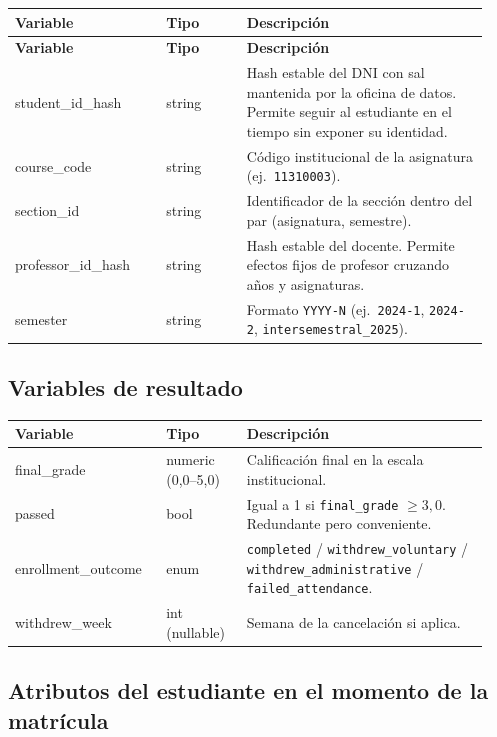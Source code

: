 \documentclass[11pt,a4paper]{article}
\begin{document}
\begin{longtable}{@{}>{\ttfamily}p{0.30\linewidth}p{0.16\linewidth}p{0.48\linewidth}@{}}
\toprule
\rmfamily\textbf{Variable} & \textbf{Tipo} & \textbf{Descripción} \\
\midrule
\endfirsthead
\toprule
\rmfamily\textbf{Variable} & \textbf{Tipo} & \textbf{Descripción} \\
\midrule
\endhead
student\_id\_hash & string & Hash estable del DNI con sal mantenida por la oficina de datos. Permite seguir al estudiante en el tiempo sin exponer su identidad. \\
course\_code     & string & Código institucional de la asignatura (ej.\ \texttt{11310003}). \\
section\_id      & string & Identificador de la sección dentro del par (asignatura, semestre). \\
professor\_id\_hash & string & Hash estable del docente. Permite efectos fijos de profesor cruzando años y asignaturas. \\
semester         & string & Formato \texttt{YYYY-N} (ej.\ \texttt{2024-1}, \texttt{2024-2}, \texttt{intersemestral\_2025}). \\
\bottomrule
\end{longtable}

\subsection{Variables de resultado}

\begin{longtable}{@{}>{\ttfamily}p{0.30\linewidth}p{0.16\linewidth}p{0.48\linewidth}@{}}
\toprule
\rmfamily\textbf{Variable} & \textbf{Tipo} & \textbf{Descripción} \\
\midrule
\endhead
final\_grade        & numeric (0,0--5,0) & Calificación final en la escala institucional. \\
passed              & bool & Igual a 1 si \texttt{final\_grade} $\geq 3{,}0$. Redundante pero conveniente. \\
enrollment\_outcome & enum & \texttt{completed} / \texttt{withdrew\_voluntary} / \texttt{withdrew\_administrative} / \texttt{failed\_attendance}. \\
withdrew\_week      & int (nullable) & Semana de la cancelación si aplica. \\
\bottomrule
\end{longtable}

\subsection{Atributos del estudiante en el momento de la matrícula}
\end{document}
